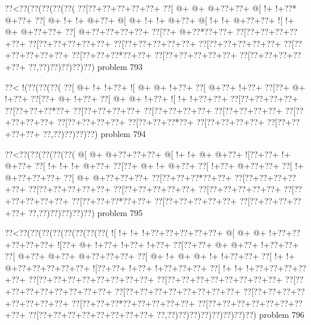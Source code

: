 \vbox{\vbox{\goo
\0??<\0??(\0??(\0??(\0??(\0??(
\0??[\0??+\0??+\0??+\0??+\0??+
\0??[\- @+\- @+\- @+\0??+\0??+
\- @[\- !+\- !+\0??*\- @+\0??+
\0??[\- @+\- !+\- !+\- @+\0??+
\- @[\- @+\- !+\- !+\- @+\0??+
\- @[\- !+\- !+\- @+\0??+\0??+
\- ![\- !+\- @+\- @+\0??+\0??+
\0??[\- @+\0??+\0??+\0??+\0??+
\0??[\0??+\- @+\0??*\0??+\0??+
\0??[\0??+\0??+\0??+\0??+\0??+
\0??[\0??+\0??+\0??+\0??+\0??+
\0??[\0??+\0??+\0??+\0??+\0??+
\0??[\0??+\0??+\0??+\0??+\0??+
\0??[\0??+\0??+\0??+\0??+\0??+
\0??[\0??+\0??+\0??*\0??+\0??+
\0??[\0??+\0??+\0??+\0??+\0??+
\0??[\0??+\0??+\0??+\0??+\0??+
\0??,\0??)\0??)\0??)\0??)\0??)
}
\hfil problem 793\hfil\break
}

\vbox{\vbox{\goo
\0??<\- !(\0??(\0??(\0??(
\0??[\- @+\- !+\- !+\0??+
\- ![\- @+\- @+\- !+\0??+
\0??[\- @+\0??+\- !+\0??+
\0??[\0??+\- @+\- !+\0??+
\0??[\0??+\- @+\- !+\0??+
\0??[\- @+\- @+\- !+\0??+
\- ![\- !+\- !+\0??+\0??+
\0??[\0??+\0??+\0??+\0??+
\0??[\0??+\0??+\0??*\0??+
\0??[\0??+\0??+\0??+\0??+
\0??[\0??+\0??+\0??+\0??+
\0??[\0??+\0??+\0??+\0??+
\0??[\0??+\0??+\0??+\0??+
\0??[\0??+\0??+\0??+\0??+
\0??[\0??+\0??+\0??*\0??+
\0??[\0??+\0??+\0??+\0??+
\0??[\0??+\0??+\0??+\0??+
\0??,\0??)\0??)\0??)\0??)
}
\hfil problem 794\hfil\break
}

\vbox{\vbox{\goo
\0??<\0??(\0??(\0??(\0??(\0??(
\- @[\- @+\- @+\0??+\0??+\0??+
\- @[\- !+\- !+\- @+\- @+\0??+
\- ![\0??+\0??+\- !+\- @+\0??+
\0??[\- !+\- !+\- !+\- @+\0??+
\0??[\0??+\- @+\- !+\- @+\0??+
\0??[\- !+\0??+\- @+\0??+\0??+
\0??[\- !+\- @+\0??+\0??+\0??+
\0??[\- @+\- @+\0??+\0??+\0??+
\0??[\0??+\0??+\0??*\0??+\0??+
\0??[\0??+\0??+\0??+\0??+\0??+
\0??[\0??+\0??+\0??+\0??+\0??+
\0??[\0??+\0??+\0??+\0??+\0??+
\0??[\0??+\0??+\0??+\0??+\0??+
\0??[\0??+\0??+\0??+\0??+\0??+
\0??[\0??+\0??+\0??*\0??+\0??+
\0??[\0??+\0??+\0??+\0??+\0??+
\0??[\0??+\0??+\0??+\0??+\0??+
\0??,\0??)\0??)\0??)\0??)\0??)
}
\hfil problem 795\hfil\break
}

\vbox{\vbox{\goo
\0??<\0??(\0??(\0??(\0??(\0??(\0??(\0??(\0??(
\- ![\- !+\- !+\- !+\0??+\0??+\0??+\0??+\0??+
\- @[\- @+\- @+\- !+\0??+\0??+\0??+\0??+\0??+
\- ![\0??+\- @+\- !+\0??+\- !+\0??+\- !+\0??+
\0??[\0??+\0??+\- @+\- @+\0??+\- !+\0??+\0??+
\0??[\- @+\0??+\- @+\0??+\- @+\0??+\0??+\0??+
\0??[\- @+\- !+\- @+\- @+\- !+\- !+\0??+\0??+
\0??[\- !+\- !+\- @+\0??+\0??+\0??+\0??+\0??+
\- ![\0??+\0??+\- !+\0??+\- !+\0??+\0??+\0??+
\0??[\- !+\- !+\- !+\0??+\0??+\0??+\0??+\0??+
\0??[\0??+\0??+\0??+\0??+\0??+\0??+\0??+\0??+
\0??[\0??+\0??+\0??+\0??+\0??+\0??+\0??+\0??+
\0??[\0??+\0??+\0??+\0??+\0??+\0??+\0??+\0??+
\0??[\0??+\0??+\0??+\0??+\0??+\0??+\0??+\0??+
\0??[\0??+\0??+\0??+\0??+\0??+\0??+\0??+\0??+
\0??[\0??+\0??+\0??*\0??+\0??+\0??+\0??+\0??+
\0??[\0??+\0??+\0??+\0??+\0??+\0??+\0??+\0??+
\0??[\0??+\0??+\0??+\0??+\0??+\0??+\0??+\0??+
\0??,\0??)\0??)\0??)\0??)\0??)\0??)\0??)\0??)
}
\hfil problem 796\hfil\break
}


